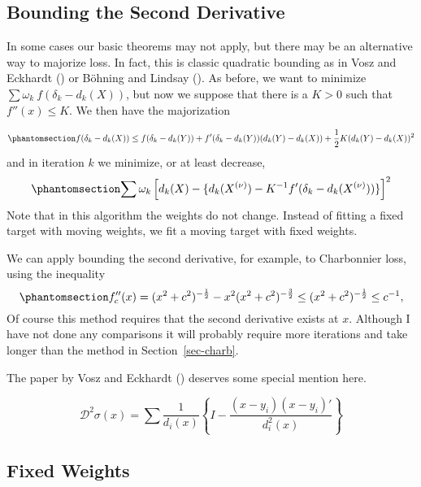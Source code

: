 \documentclass[
  12pt,
  letterpaper,
  DIV=11,
  numbers=noendperiod]{scrartcl}
\theoremstyle{definition}
\theoremstyle{plain}
\theoremstyle{plain}
\theoremstyle{plain}
\theoremstyle{definition}
\theoremstyle{remark}
\begin{document}
\subsection{Bounding the Second
Derivative}\label{bounding-the-second-derivative}

In some cases our basic theorems may not apply, but there may be an
alternative way to majorize loss. In fact, this is classic quadratic
bounding as in Vosz and Eckhardt ()
or Böhning and Lindsay (). As
before, we want to minimize \(\sum \omega_k\ f(\delta_k-d_k(X))\), but
now we suppose that there is a \(K>0\) such that \(f''(x)\leq K\). We
then have the majorization

\begin{equation}\phantomsection\label{eq-qbound}{
f(\delta_k-d_k(X))\leq f(\delta_k-d_k(Y))+f'(\delta_k-d_k(Y))(d_k(Y)-d_k(X))+\frac12K(d_k(Y)-d_k(X))^2
}\end{equation} and in iteration \(k\) we minimize, or at least
decrease, \begin{equation}\phantomsection\label{eq-qiter}{
\sum \omega_k\left[d_k(X)-\{d_k(X^{(\nu)})-K^{-1}f'(\delta_k-d_k(X^{(\nu)}))\}\right]^2
}\end{equation} Note that in this algorithm the weights do not change.
Instead of fitting a fixed target with moving weights, we fit a moving
target with fixed weights.

We can apply bounding the second derivative, for example, to Charbonnier
loss, using the inequality
\begin{equation}\phantomsection\label{eq-chark}{
f_c''(x)=(x^2 + c^2)^{-\frac12}-x^2(x^2 + c^2)^{-\frac32}\leq(x^2 + c^2)^{-\frac12}\leq c^{-1},
}\end{equation} Of course this method requires that the second
derivative exists at \(x\). Although I have not done any comparisons it
will probably require more iterations and take longer than the method in
Section~\ref{sec-charb}.

The paper by Vosz and Eckhardt ()
deserves some special mention here.

\[
\mathcal{D}^2\sigma(x)=\sum\frac{1}{d_i(x)}\left\{I-\frac{(x-y_i)(x-y_i)'}{d_i^2(x)}\right\}
\]

\subsection{Fixed Weights}\label{fixed-weights}
\end{document}
